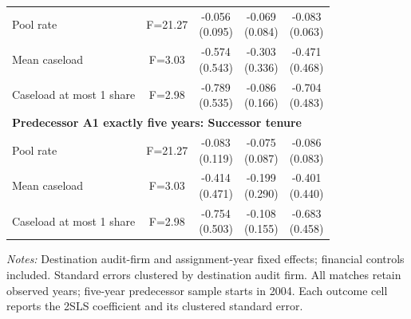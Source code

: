 \documentclass[10pt]{article}
\begin{document}
\begin{minipage}{19cm}
\begin{threeparttable}
\begin{tabular}{p{}cccc}
Pool rate & F=21.27 & \shortstack{-0.056\\(0.095)} & \shortstack{-0.069\\(0.084)} & \shortstack{-0.083\\(0.063)} \\
Mean caseload & F=3.03 & \shortstack{-0.574\\(0.543)} & \shortstack{-0.303\\(0.336)} & \shortstack{-0.471\\(0.468)} \\
Caseload at most 1 share & F=2.98 & \shortstack{-0.789\\(0.535)} & \shortstack{-0.086\\(0.166)} & \shortstack{-0.704\\(0.483)} \\
\multicolumn{5}{l}{\textbf{Predecessor A1 exactly five years: Successor tenure}} \\
Pool rate & F=21.27 & \shortstack{-0.083\\(0.119)} & \shortstack{-0.075\\(0.087)} & \shortstack{-0.086\\(0.083)} \\
Mean caseload & F=3.03 & \shortstack{-0.414\\(0.471)} & \shortstack{-0.199\\(0.290)} & \shortstack{-0.401\\(0.440)} \\
Caseload at most 1 share & F=2.98 & \shortstack{-0.754\\(0.503)} & \shortstack{-0.108\\(0.155)} & \shortstack{-0.683\\(0.458)} \\
\bottomrule
\end{tabular}
\begin{tablenotes}\fontsize{9}{11}\selectfont
\item \raggedright \fontsize{9}{11}\selectfont \textit{Notes:} Destination audit-firm and assignment-year fixed effects; financial controls included. Standard errors clustered by destination audit firm. All matches retain observed years; five-year predecessor sample starts in 2004. Each outcome cell reports the 2SLS coefficient and its clustered standard error.
\end{tablenotes}
\end{threeparttable}

\end{minipage}
\end{document}
